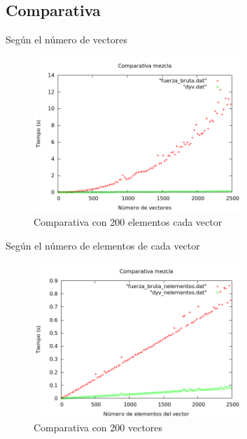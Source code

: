 \subsection{Comparativa}
\begin{frame}{Según el número de vectores}
	\begin{block}
	
	\begin{figure}[htb] 
	\centering
	\includegraphics[width=0.7\textwidth]														{../Obligatorio/Graficas/comparativa_kvectores.png}
	\caption{Comparativa con 200 elementos cada vector} 
	\label{fig:comp_kvectores} 
	\end{figure}
	\end{block}
\end{frame}




\begin{frame}{Según el número de elementos de cada vector}
	\begin{block}
	
	\begin{figure}[htb] 
	\centering
	\includegraphics[width=0.7\textwidth]														{../Obligatorio/Graficas/comparativa_nelementos.png}
	\caption{Comparativa con 200 vectores} 
	\label{fig:comp_nelementos} 
\end{figure}
	\end{block}
\end{frame}


